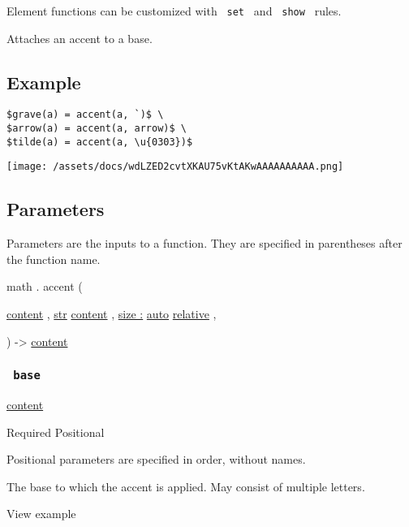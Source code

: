 \label{element-tooltip}
Element functions can be customized with \texttt{\ set\ } and
\texttt{\ show\ } rules.

Attaches an accent to a base.

\subsection{Example}\label{example}

\begin{verbatim}
$grave(a) = accent(a, `)$ \
$arrow(a) = accent(a, arrow)$ \
$tilde(a) = accent(a, \u{0303})$
\end{verbatim}

\texttt{[image: /assets/docs/wdLZED2cvtXKAU75vKtAKwAAAAAAAAAA.png]}

\subsection{\texorpdfstring{{ Parameters
}}{ Parameters }}\label{parameters}

\label{parameters-tooltip}
Parameters are the inputs to a function. They are specified in
parentheses after the function name.

math { . } { accent } (

{ \href{/docs/reference/foundations/content/}{content} , } {
\href{/docs/reference/foundations/str/}{str}
\href{/docs/reference/foundations/content/}{content} , } {
\hyperref[parameters-size]{size :}
\href{/docs/reference/foundations/auto/}{auto}
\href{/docs/reference/layout/relative/}{relative} , }

) -\textgreater{} \href{/docs/reference/foundations/content/}{content}

\subsubsection{\texorpdfstring{\texttt{\ base\ }}{ base }}\label{parameters-base}

\href{/docs/reference/foundations/content/}{content}

{Required} {{ Positional }}

\label{parameters-base-positional-tooltip}
Positional parameters are specified in order, without names.

The base to which the accent is applied. May consist of multiple
letters.


View example

